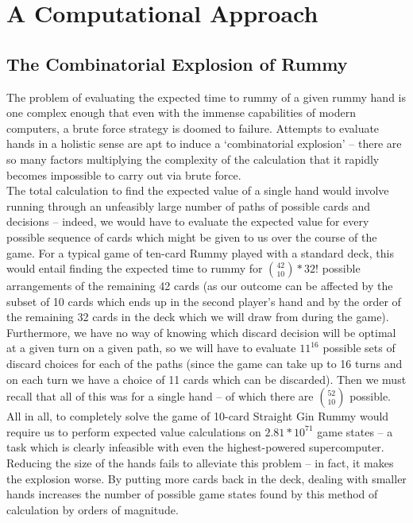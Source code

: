 \documentclass[paper=a4, fontsize=11pt,twoside]{report}   %
\begin{document}
\chapter{A Computational Approach}

\section{The Combinatorial Explosion of Rummy}

The problem of evaluating the expected time to rummy of a given rummy hand is one complex enough that even with the immense capabilities of modern computers, a brute force strategy is doomed to failure. Attempts to evaluate hands in a holistic sense are apt to induce a ‘combinatorial explosion’ – there are so many factors multiplying the complexity of the calculation that it rapidly becomes impossible to carry out via brute force.\\

The total calculation to find the expected value of a single hand would involve running through an unfeasibly large number of paths of possible cards and decisions – indeed, we would have to evaluate the expected value for every possible sequence of cards which might be given to us over the course of the game. For a typical game of ten-card Rummy played with a standard deck, this would entail finding the expected time to rummy for $\binom{42}{10}*32!$ possible arrangements of the remaining 42 cards (as our outcome can be affected by the subset of 10 cards which ends up in the second player’s hand and by the order of the remaining 32 cards in the deck which we will draw from during the game). Furthermore, we have no way of knowing which discard decision will be optimal at a given turn on a given path, so we will have to evaluate $11^{16}$ possible sets of discard choices for each of the paths (since the game can take up to 16 turns and on each turn we have a choice of 11 cards which can be discarded). Then we must recall that all of this was for a single hand – of which there are $\binom{52}{10}$ possible. All in all, to completely solve the game of 10-card Straight Gin Rummy would require us to perform expected value calculations on $2.81*10^{71}$ game states – a task which is clearly infeasible with even the highest-powered supercomputer.\\

Reducing the size of the hands fails to alleviate this problem – in fact, it makes the explosion worse. By putting more cards back in the deck, dealing with smaller hands increases the number of possible game states found by this method of calculation by orders of magnitude. 
\end{document}
